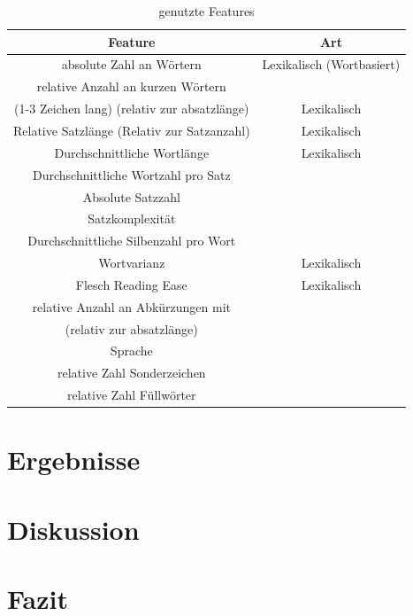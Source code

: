 \documentclass[conference]{IEEEtran}
\begin{document}
	\begin{table}[htbp]
		\caption{genutzte Features}
		\begin{center}
			\begin{tabular}{|c|c|}
				\hline
				\textbf{Feature} & \textbf{Art} \\
				\hline 
				absolute Zahl an Wörtern & Lexikalisch (Wortbasiert) \\
				\hline
				relative Anzahl an kurzen Wörtern \\ (1-3 Zeichen lang) (relativ zur absatzlänge) & Lexikalisch \\
				\hline 
				Relative Satzlänge (Relativ zur Satzanzahl) & Lexikalisch \\
				\hline
				Durchschnittliche Wortlänge & Lexikalisch \\
				\hline
				Durchschnittliche Wortzahl pro Satz & \\
				\hline
				Absolute Satzzahl & \\
				\hline
				Satzkomplexität & \\
				\hline
				Durchschnittliche Silbenzahl pro Wort & \\
				\hline
				Wortvarianz & Lexikalisch \\
				\hline
				Flesch Reading Ease & Lexikalisch \\
				\hline
				relative Anzahl an Abkürzungen mit \grq \\(relativ zur absatzlänge) & \\
				\hline 
				Sprache \cite{mf_b6} & \\
				\hline
				relative Zahl Sonderzeichen & \\
				\hline
				relative Zahl Füllwörter & \\
				\hline
			\end{tabular}
			\label{tab:features}
		\end{center}
	\end{table}
\section{Ergebnisse}
\section{Diskussion}
\section{Fazit}
\end{document}
